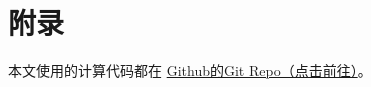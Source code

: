 \documentclass[UTF8,zihao=5]{ctexart} %
\newcommand*{\mean}[1]{\overline{#1}}
\begin{document}



{}



\section*{附录}

本文使用的计算代码都在
\href{https://github.com/harryzhou2000/HW_ACFD}{Github的Git Repo（点击前往）}。
























\end{document}
